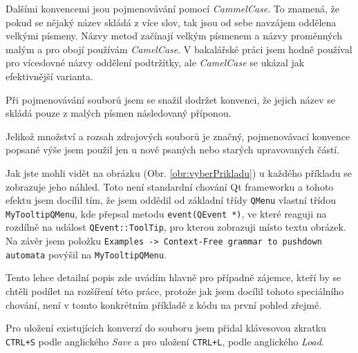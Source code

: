 
Dalšími konvencemi jsou pojmenovávání pomocí \textit{CammelCase}. To znamená, že pokud se nějaký název skládá z více slov, tak jsou od sebe navzájem oddělena velkými písmeny. Názvy metod začínají velkým písmenem a názvy proměnných malým a pro obojí používám \textit{CamelCase}. V bakalářské práci jsem hodně používal pro víceslovné názvy oddělení podtržítky, ale \textit{CamelCase} se ukázal jak efektivnější varianta. 

Při pojmenovávání souborů jsem se snažil dodržet konvenci, že jejich název se skládá pouze z malých písmen následovaný příponou.

Jelikož množství a rozsah zdrojových souborů je značný, pojmenovávací konvence popsané výše jsem použil jen u nově psaných nebo starých upravovaných částí. 


Jak jste mohli vidět na obrázku (Obr. \ref{obr:vyberPrikladu}) u každého příkladu se zobrazuje jeho náhled. Toto není standardní chování Qt frameworku a tohoto efektu jsem docílil tím, že jsem oddědil od základní třídy \texttt{QMenu} vlastní třídou \texttt{MyTooltipQMenu}, kde přepsal metodu \texttt{event(QEvent *)}, ve které reaguji na rozdílně na událost \texttt{QEvent::ToolTip}, pro kterou zobrazuji místo textu obrázek. Na závěr jsem položku \texttt{Examples -> Context-Free grammar to pushdown automata} povýšil na \texttt{MyTooltipQMenu}.

Tento lehce detailní popis zde uvádím hlavně pro případně zájemce, kteří by se chtěli podílet na rozšíření této práce, protože jak jsem docílil tohoto speciálního chování, není v tomto konkrétním příkladě z kódu na první pohled zřejmé.

Pro uložení existujících konverzí do souboru jsem přidal klávesovou zkratku \texttt{CTRL+S} podle anglického \textit{Save} a pro uložení \texttt{CTRL+L}, podle anglického \textit{Load}.

